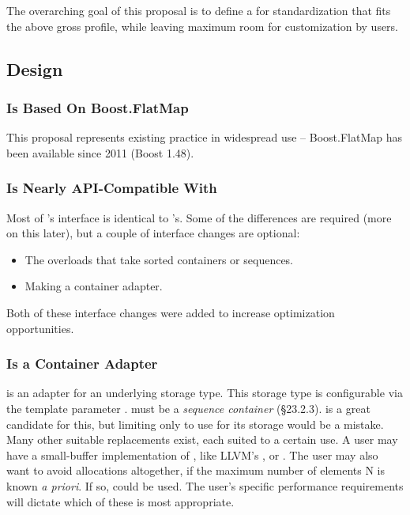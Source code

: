 The overarching goal of this proposal is to define a  for
standardization that fits the above gross profile, while leaving maximum room
for customization by users.

\subsection{Design}

\subsubsection{ Is Based On Boost.FlatMap}

This proposal represents existing practice in widespread use -- Boost.FlatMap
has been available since 2011 (Boost 1.48).

\subsubsection{ Is Nearly API-Compatible With }

Most of 's interface is identical to 's.  Some of the
differences are required (more on this later), but a couple of interface
changes are optional:

\begin{itemize}
  \item The overloads that take sorted containers or sequences.

  \item Making  a container adapter.
\end{itemize}

Both of these interface changes were added to increase optimization
opportunities.

\subsubsection{ Is a Container Adapter}

 is an adapter for an underlying storage type.  This storage
type is configurable via the template parameter .
 must be a \textit{sequence container} (\S23.2.3).
 is a great candidate for this, but limiting  only
to use  for its storage would be a mistake.  Many other suitable
replacements exist, each suited to a certain use.  A user may have a
small-buffer implementation of , like LLVM's ,
or .  The user may also want to avoid
allocations altogether, if the maximum number of elements N is known \textit{a
  priori}.  If so,  could be used.  The
user's specific performance requirements will dictate which of these is most
appropriate.\\

